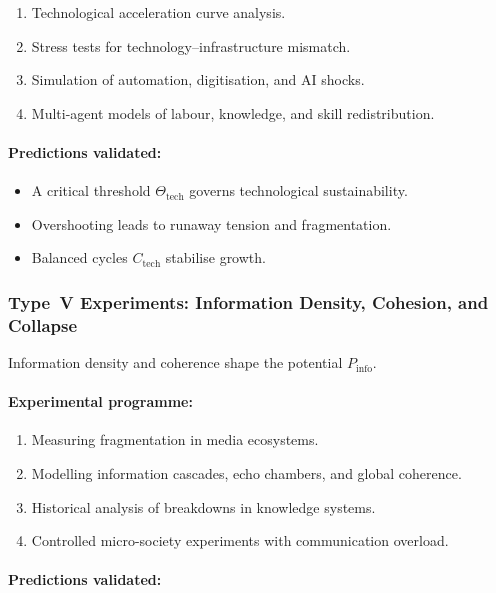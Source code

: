 \begin{enumerate}
    \item Technological acceleration curve analysis.
    \item Stress tests for technology–infrastructure mismatch.
    \item Simulation of automation, digitisation, and AI shocks.
    \item Multi-agent models of labour, knowledge, and skill redistribution.
\end{enumerate}

\paragraph{Predictions validated:}

\begin{itemize}
    \item A critical threshold $\Theta_{\mathrm{tech}}$ governs technological sustainability.
    \item Overshooting leads to runaway tension and fragmentation.
    \item Balanced cycles $C_{\mathrm{tech}}$ stabilise growth.
\end{itemize}



\subsubsection{Type~V Experiments: Information Density, Cohesion, and Collapse}

Information density and coherence shape the potential $P_{\mathrm{info}}$.

\paragraph{Experimental programme:}

\begin{enumerate}
    \item Measuring fragmentation in media ecosystems.
    \item Modelling information cascades, echo chambers, and global coherence.
    \item Historical analysis of breakdowns in knowledge systems.
    \item Controlled micro-society experiments with communication overload.
\end{enumerate}

\paragraph{Predictions validated:}

